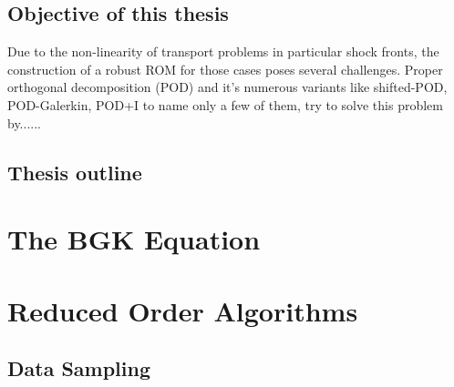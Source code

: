 \documentclass[12pt, a4paper]{article}
\begin{document}
\subsection{Objective of this thesis}
Due to the non-linearity of transport problems in particular shock fronts, the construction of a robust ROM for those cases poses several challenges. Proper orthogonal decomposition (POD) and it's numerous variants like shifted-POD\cite{bibid}, POD-Galerkin\cite{bibid}, POD+I \cite{bibid} to name only a few of them, try to solve this problem by......
\subsection{Thesis outline}
\section{The BGK Equation}
\section{Reduced Order Algorithms}
\subsection{Data Sampling}
\end{document}

